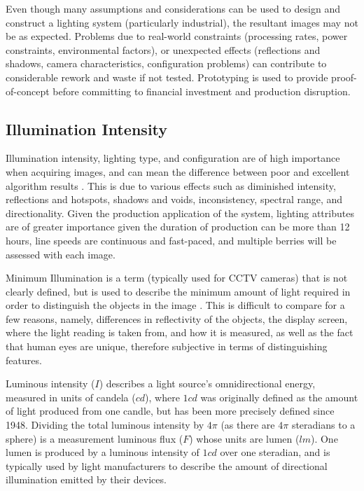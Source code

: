 \documentclass[fleqn,twoside,12pt]{report}
\begin{document}
Even though many assumptions and considerations can be used to design and construct a lighting system (particularly industrial), the resultant images may not be as expected. Problems due to real-world constraints (processing rates, power constraints, environmental factors), or unexpected effects (reflections and shadows, camera characteristics, configuration problems) can contribute to considerable rework and waste if not tested. Prototyping is used to provide proof-of-concept before committing to financial investment and production disruption.



\subsection{Illumination Intensity}

Illumination intensity, lighting type, and configuration are of high importance when acquiring images, and can mean the difference between poor and excellent algorithm results \cite{lorente,kondo,liu2}. This is due to various effects such as diminished intensity, reflections and hotspots, shadows and voids, inconsistency, spectral range, and directionality. Given the production application of the system, lighting attributes are of greater importance given the duration of production can be more than 12 hours, line speeds are continuous and fast-paced, and multiple berries will be assessed with each image.

Minimum Illumination is a term (typically used for CCTV cameras) that is not clearly defined, but is used to describe the minimum amount of light required in order to distinguish the objects in the image \cite{min_illumination}. This is difficult to compare for a few reasons, namely, differences in reflectivity of the objects, the display screen, where the light reading is taken from, and how it is measured, as well as the fact that human eyes are unique, therefore subjective in terms of distinguishing features. 

Luminous intensity ($I$) describes a light source's omnidirectional energy, measured in units of candela ($cd$), where $1cd$ was originally defined as the amount of light produced from one candle, but has been more precisely defined since 1948\cite{light_units}. Dividing the total luminous intensity by $4\pi$ (as there are $4\pi$ steradians to a sphere) is a measurement luminous flux ($F$) whose units are lumen ($lm$). One lumen is produced by a luminous intensity of $1cd$ over one steradian, and is typically used by light manufacturers to describe the amount of directional illumination emitted by their devices.
\end{document}
